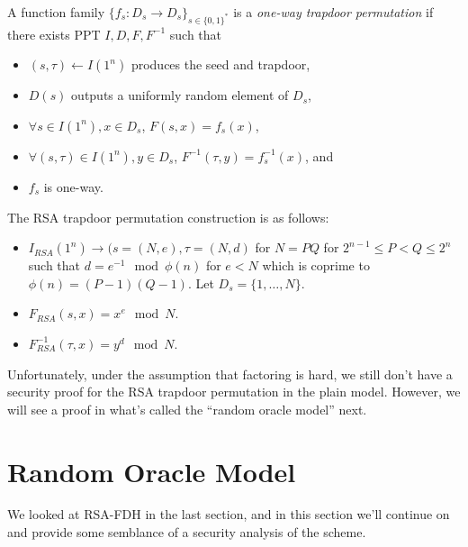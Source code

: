 \documentclass[12pt]{tufte-book}
\begin{document}
\begin{definition} 
A function family $\{f_s: D_s \to D_s\}_{s \in \{0,1\}^*}$ is a \emph{one-way trapdoor permutation} if there exists PPT $I, D, F, F^{-1}$ such that 
\begin{itemize}
    \item $(s, \tau) \leftarrow I(1^n)$ produces the seed and trapdoor, 

    \item $D(s)$ outputs a uniformly random element of $D_s$, 

    \item $\forall s \in I(1^n), x \in D_s$, $F(s, x) = f_s(x)$, 

    \item $\forall (s, \tau) \in I(1^n), y \in D_s$, $F^{-1}(\tau, y) = f_s^{-1}(x)$, and 

    \item $f_s$ is one-way. 
\end{itemize}
\end{definition} 

The RSA trapdoor permutation construction is as follows: 
\begin{itemize} 

    \item $I_{RSA}(1^n) \rightarrow (s = (N, e), \tau = (N, d)$ for $N = PQ$ for $2^{n-1} \leq P < Q \leq 2^n$ such that $d = e^{-1} \mod \phi(n)$ for $e < N$ which is coprime to $\phi(n) = (P-1)(Q-1)$. 
    Let $D_s = \{1, \ldots, N\}$. 

    \item $F_{RSA}(s, x) = x^e \mod N$. 

    \item $F_{RSA}^{-1}(\tau, x) = y^d \mod N$. 
\end{itemize}
Unfortunately, under the assumption that factoring is hard, we still don't have a security proof for the RSA trapdoor permutation in the plain model. 
However, we will see a proof in what's called the ``random oracle model'' next. 




 \section{Random Oracle Model}

We looked at RSA-FDH in the last section, and in this section we'll continue on and provide some semblance of a security analysis of the scheme.
\end{document}
